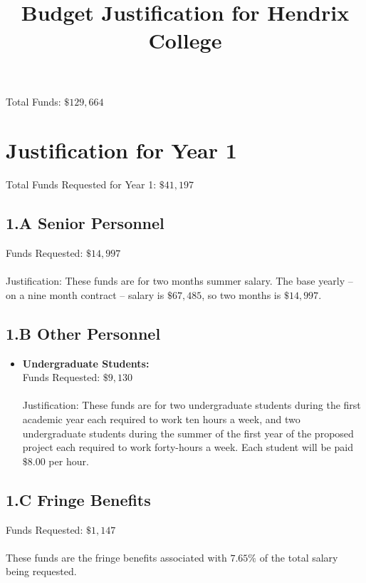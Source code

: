 \documentclass[11pt]{article}
\title{\vspace{-50px}Budget Justification for Hendrix College}
\date{\vspace{-60px}}
\begin{document}
\maketitle  

\noindent
Total Funds: $\$129,664$\\
\vspace{-20px}
\section{Justification for Year 1}
\label{sec:year_1}
Total Funds Requested for Year 1: $\$41,197$\\
\vspace{-20px}
\subsection*{1.A Senior Personnel}
\label{subsec:a_senior_personnel}

Funds Requested: $\$14,997$\\ \ \\ Justification: These funds are for
two months summer salary. The base yearly -- on a nine month contract
-- salary is $\$67,485$, so two months is $\$14,997$.  

\subsection*{1.B Other Personnel}
\label{subsec:personnel}
\begin{itemize}

\item \textbf{Undergraduate Students:}\\ Funds Requested:
  $\$9,130$\\ \ \\ Justification: These funds are for two
  undergraduate students during the first academic year each required
  to work ten hours a week, and two undergraduate students during the
  summer of the first year of the proposed project each required to
  work forty-hours a week.  Each student will be paid $\$8.00$ per
  hour.
\end{itemize}

\subsection*{1.C Fringe Benefits}
\label{subsec:c_fringe_benefits}
Funds Requested: $\$1,147$\\ \ \\ These funds are the fringe benefits
associated with $7.65\%$ of the total salary being requested.
\end{document}
